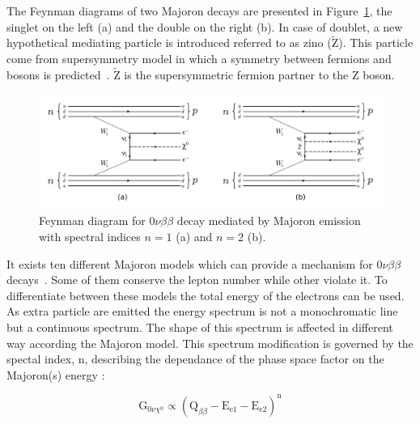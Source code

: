 \documentclass[main.tex]{subfiles}
\begin{document}


\NI The Feynman diagrams of two Majoron decays are presented in Figure~\ref{0nubbFeynmanDiagram_Majoron}, the singlet on the left (a) and the double on the right (b). In case of doublet, a new hypothetical mediating particle is introduced referred to as zino ($\tilde{\text{Z}}$). This particle come from supersymmetry model in which a symmetry between fermions and bosons is predicted~\cite{SUSYbasis}. $\tilde{\text{Z}}$ is the supersymmetric fermion partner to the Z boson.


\begin{figure}[h!]
\begin{center}
\includegraphics[scale=0.4]{pictures/Chap2/0nubbFeynmanDiagram_Majoron.pdf}
\caption{Feynman diagram for 0$\nu\beta\beta$ decay mediated by Majoron emission with spectral indices $n = 1$ (a) and $n = 2$ (b).}
\label{0nubbFeynmanDiagram_Majoron}
\end{center}
\end{figure}


\NI It exists ten different Majoron models which can provide a mechanism for 0$\nu\beta\beta$ decays~\cite{MajoronDecayMode}. Some of them conserve the lepton number while other violate it. To differentiate between these models the total energy of the electrons can be used. As extra particle are emitted the energy spectrum is not a monochromatic line but a continuous spectrum. The shape of this spectrum is affected in different way according the Majoron model. This spectrum modification is governed by the spectal index, n, describing the dependance of the phase space factor on the Majoron(s) energy : 


\begin{equation}
\text{G}_{\text{0}\nu\chi^\text{0}} \propto (\text{Q}_{\beta\beta} - \text{E}_{\text{e1}} - \text{E}_{\text{e2}})^\text{n}
\end{equation}
\end{document}

